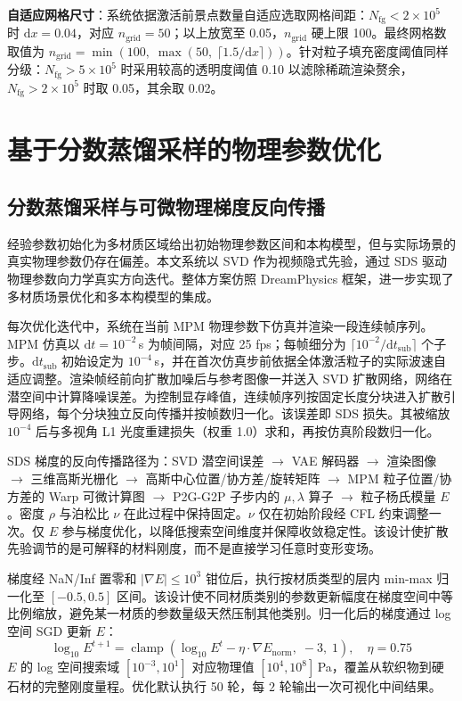 \textbf{自适应网格尺寸}：系统依据激活前景点数量自适应选取网格间距：$N_{\text{fg}}<2\times10^5$ 时 $\mathrm{d}x=0.04$，对应 $n_{\text{grid}}=50$；以上放宽至 0.05，$n_{\text{grid}}$ 硬上限 100。最终网格数取值为 $n_{\text{grid}}=\min\left(100,\;\max\left(50,\;\lceil1.5/\mathrm{d}x\rceil\right)\right)$。针对粒子填充密度阈值同样分级：$N_{\text{fg}}>5\times10^5$ 时采用较高的透明度阈值 0.10 以滤除稀疏渲染赘余，$N_{\text{fg}}>2\times10^5$ 时取 0.05，其余取 0.02。

\section{基于分数蒸馏采样的物理参数优化}

\subsection{分数蒸馏采样与可微物理梯度反向传播}
经验参数初始化为多材质区域给出初始物理参数区间和本构模型，但与实际场景的真实物理参数仍存在偏差。本文系统以 SVD 作为视频隐式先验，通过 SDS 驱动物理参数向力学真实方向迭代。整体方案仿照 DreamPhysics\cite{dreamphysics} 框架，进一步实现了多材质场景优化和多本构模型的集成。

每次优化迭代中，系统在当前 MPM 物理参数下仿真并渲染一段连续帧序列。MPM 仿真以 $\mathrm{d}t=10^{-2}$\,s 为帧间隔，对应 25 fps；每帧细分为 $\lceil10^{-2}/\mathrm{d}t_{\text{sub}}\rceil$ 个子步。$\mathrm{d}t_{\text{sub}}$ 初始设定为 $10^{-4}$\,s，并在首次仿真步前依据全体激活粒子的实际波速自适应调整。渲染帧经前向扩散加噪后与参考图像一并送入 SVD 扩散网络，网络在潜空间中计算降噪误差。为控制显存峰值，连续帧序列按固定长度分块进入扩散引导网络，每个分块独立反向传播并按帧数归一化。该误差即 SDS 损失。其被缩放 $10^{-4}$ 后与多视角 L1 光度重建损失（权重 1.0）求和，再按仿真阶段数归一化。

SDS 梯度的反向传播路径为：SVD 潜空间误差 $\to$ VAE 解码器 $\to$ 渲染图像 $\to$ 三维高斯光栅化 $\to$ 高斯中心位置/协方差/旋转矩阵 $\to$ MPM 粒子位置/协方差的 Warp 可微计算图 $\to$ P2G-G2P 子步内的 $\mu,\lambda$ 算子 $\to$ 粒子杨氏模量 $E$。密度 $\rho$ 与泊松比 $\nu$ 在此过程中保持固定。$\nu$ 仅在初始阶段经 CFL 约束调整一次。仅 $E$ 参与梯度优化，以降低搜索空间维度并保障收敛稳定性。该设计使扩散先验调节的是可解释的材料刚度，而不是直接学习任意时变形变场。

梯度经 NaN/Inf 置零和 $|\nabla E|\le10^3$ 钳位后，执行按材质类型的层内 min-max 归一化至 $[-0.5, 0.5]$ 区间。该设计使不同材质类别的参数更新幅度在梯度空间中等比例缩放，避免某一材质的参数量级天然压制其他类别。归一化后的梯度通过 log 空间 SGD 更新 $E$：
\begin{equation}
\log_{10}E^{t+1}=\operatorname{clamp}\left(\log_{10}E^{t}-\eta\cdot\nabla E_{\text{norm}},\;-3,\;1\right),\quad\eta=0.75
\end{equation}
$E$ 的 log 空间搜索域 $[10^{-3}, 10^{1}]$ 对应物理值 $[10^4, 10^8]$\,Pa，覆盖从软织物到硬石材的完整刚度量程。优化默认执行 50 轮，每 $2$ 轮输出一次可视化中间结果。


